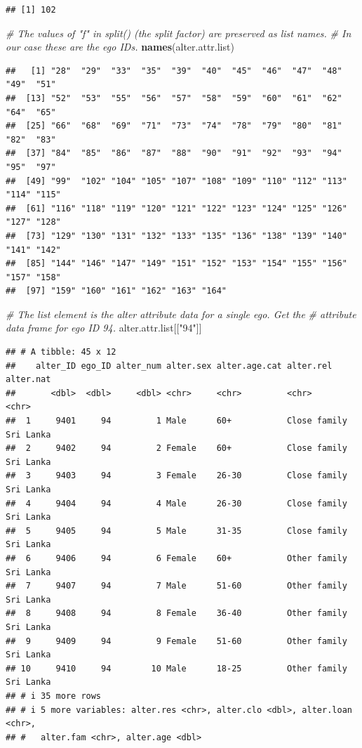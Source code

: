 \documentclass[
]{book}
\newenvironment{Shaded}{\begin{snugshade}}{\end{snugshade}}
\newcommand{\CommentTok}[1]{\textcolor[rgb]{0.56,0.35,0.01}{\textit{#1}}}
\newcommand{\FunctionTok}[1]{\textcolor[rgb]{0.13,0.29,0.53}{\textbf{#1}}}
\newcommand{\NormalTok}[1]{#1}
\newcommand{\StringTok}[1]{\textcolor[rgb]{0.31,0.60,0.02}{#1}}
\begin{document}
\begin{verbatim}
## [1] 102
\end{verbatim}

\begin{Shaded}
\begin{Highlighting}[]
\CommentTok{\# The values of "f" in split() (the split factor) are preserved as list names.}
\CommentTok{\# In our case these are the ego IDs.}
\FunctionTok{names}\NormalTok{(alter.attr.list)}
\end{Highlighting}
\end{Shaded}

\begin{verbatim}
##   [1] "28"  "29"  "33"  "35"  "39"  "40"  "45"  "46"  "47"  "48"  "49"  "51" 
##  [13] "52"  "53"  "55"  "56"  "57"  "58"  "59"  "60"  "61"  "62"  "64"  "65" 
##  [25] "66"  "68"  "69"  "71"  "73"  "74"  "78"  "79"  "80"  "81"  "82"  "83" 
##  [37] "84"  "85"  "86"  "87"  "88"  "90"  "91"  "92"  "93"  "94"  "95"  "97" 
##  [49] "99"  "102" "104" "105" "107" "108" "109" "110" "112" "113" "114" "115"
##  [61] "116" "118" "119" "120" "121" "122" "123" "124" "125" "126" "127" "128"
##  [73] "129" "130" "131" "132" "133" "135" "136" "138" "139" "140" "141" "142"
##  [85] "144" "146" "147" "149" "151" "152" "153" "154" "155" "156" "157" "158"
##  [97] "159" "160" "161" "162" "163" "164"
\end{verbatim}

\begin{Shaded}
\begin{Highlighting}[]
\CommentTok{\# The list element is the alter attribute data for a single ego. Get the}
\CommentTok{\# attribute data frame for ego ID 94.}
\NormalTok{alter.attr.list[[}\StringTok{"94"}\NormalTok{]]}
\end{Highlighting}
\end{Shaded}

\begin{verbatim}
## # A tibble: 45 x 12
##    alter_ID ego_ID alter_num alter.sex alter.age.cat alter.rel    alter.nat
##       <dbl>  <dbl>     <dbl> <chr>     <chr>         <chr>        <chr>    
##  1     9401     94         1 Male      60+           Close family Sri Lanka
##  2     9402     94         2 Female    60+           Close family Sri Lanka
##  3     9403     94         3 Female    26-30         Close family Sri Lanka
##  4     9404     94         4 Male      26-30         Close family Sri Lanka
##  5     9405     94         5 Male      31-35         Close family Sri Lanka
##  6     9406     94         6 Female    60+           Other family Sri Lanka
##  7     9407     94         7 Male      51-60         Other family Sri Lanka
##  8     9408     94         8 Female    36-40         Other family Sri Lanka
##  9     9409     94         9 Female    51-60         Other family Sri Lanka
## 10     9410     94        10 Male      18-25         Other family Sri Lanka
## # i 35 more rows
## # i 5 more variables: alter.res <chr>, alter.clo <dbl>, alter.loan <chr>,
## #   alter.fam <chr>, alter.age <dbl>
\end{verbatim}
\end{document}
